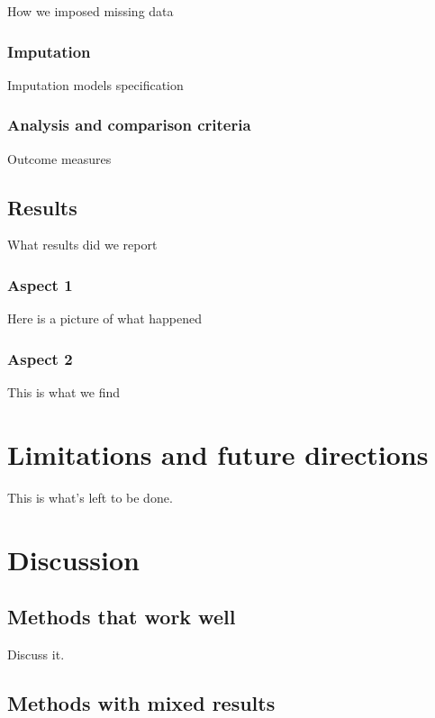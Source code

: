 \documentclass[a4paper,doc,floatsintext,natbib]{apa6}\usepackage[]{graphicx}\usepackage[]{xcolor}
\begin{document}
	How we imposed missing data	

\subsubsection{Imputation}

	Imputation models specification

\subsubsection{Analysis and comparison criteria}\label{criteria}

	Outcome measures

\subsection{Results}
	
	What results did we report

\subsubsection{Aspect 1}

	Here is a picture of what happened

\subsubsection{Aspect 2}

	This is what we find
    
\section{Limitations and future directions}

	This is what's left to be done.
    
\section{Discussion}

\subsection{Methods that work well}

	Discuss it.

\subsection{Methods with mixed results}
\end{document}

